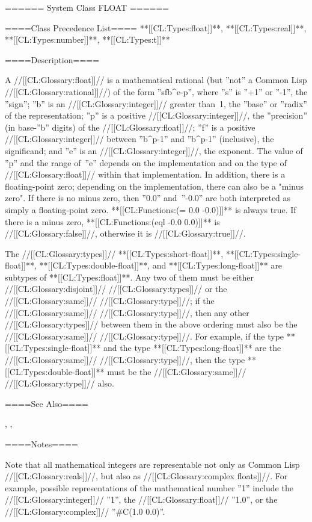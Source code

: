 ====== System Class FLOAT ======

====Class Precedence List==== **[[CL:Types:float]]**, **[[CL:Types:real]]**, **[[CL:Types:number]]**, **[[CL:Types:t]]**

====Description====

A //[[CL:Glossary:float]]// is a mathematical rational (but ''not'' a Common Lisp //[[CL:Glossary:rational]]//) of the form ''s\cdot f\cdot b^{e-p}'', where ''s'' is ''+1'' or ''-1'', the ''sign''; ''b'' is an //[[CL:Glossary:integer]]// greater than~1, the ''base'' or ''radix'' of the representation; ''p'' is a positive //[[CL:Glossary:integer]]//, the ''precision'' (in base-''b'' digits) of the //[[CL:Glossary:float]]//; ''f'' is a positive //[[CL:Glossary:integer]]// between ''b^{p-1}'' and ''b^p-1'' (inclusive), the significand; and ''e'' is an //[[CL:Glossary:integer]]//, the exponent. The value of ''p'' and the range of~''e'' depends on the implementation and on the type of //[[CL:Glossary:float]]// within that implementation. In addition, there is a floating-point zero; depending on the implementation, there can also be a "minus zero". If there is no minus zero, then ''0.0'' and~''-0.0'' are both interpreted as simply a floating-point zero. **[[CL:Functions:(= 0.0 -0.0)]]** is always true. If there is a minus zero, **[[CL:Functions:(eql -0.0 0.0)]]** is //[[CL:Glossary:false]]//, otherwise it is //[[CL:Glossary:true]]//.



The //[[CL:Glossary:types]]// **[[CL:Types:short-float]]**, **[[CL:Types:single-float]]**, **[[CL:Types:double-float]]**, and **[[CL:Types:long-float]]** are subtypes of **[[CL:Types:float]]**. Any two of them must be either //[[CL:Glossary:disjoint]]// //[[CL:Glossary:types]]// or the //[[CL:Glossary:same]]// //[[CL:Glossary:type]]//; if the //[[CL:Glossary:same]]// //[[CL:Glossary:type]]//, then any other //[[CL:Glossary:types]]// between them in the above ordering must also be the //[[CL:Glossary:same]]// //[[CL:Glossary:type]]//. For example, if the type **[[CL:Types:single-float]]** and the type **[[CL:Types:long-float]]** are the //[[CL:Glossary:same]]// //[[CL:Glossary:type]]//, then the type **[[CL:Types:double-float]]** must be the //[[CL:Glossary:same]]// //[[CL:Glossary:type]]// also.


====See Also====

{\figref\SyntaxForNumericTokens}, {\secref\NumsFromTokens}, {\secref\PrintingFloats}

====Notes====

Note that all mathematical integers are representable not only as Common Lisp //[[CL:Glossary:reals]]//, but also as //[[CL:Glossary:complex floats]]//. For example, possible representations of the mathematical number ''1'' include the //[[CL:Glossary:integer]]// ''1'', the //[[CL:Glossary:float]]// ''1.0'', or the //[[CL:Glossary:complex]]// ''#C(1.0 0.0)''.

